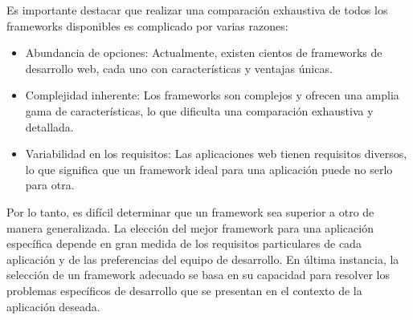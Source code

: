 Es importante destacar que realizar una comparación exhaustiva de todos los frameworks disponibles es complicado por varias razones:

\begin{itemize}
    \item Abundancia de opciones: Actualmente, existen cientos de frameworks de desarrollo web, cada uno con características y ventajas únicas.
    \item Complejidad inherente: Los frameworks son complejos y ofrecen una amplia gama de características, lo que dificulta una comparación exhaustiva y detallada.
    \item Variabilidad en los requisitos: Las aplicaciones web tienen requisitos diversos, lo que significa que un framework ideal para una aplicación puede no serlo para otra.
\end{itemize}

Por lo tanto, es difícil determinar que un framework sea superior a otro de manera generalizada. La elección del mejor framework para una aplicación específica depende en gran medida de los requisitos particulares de cada aplicación y de las preferencias del equipo de desarrollo. En última instancia, la selección de un framework adecuado se basa en su capacidad para resolver los problemas específicos de desarrollo que se presentan en el contexto de la aplicación deseada.
